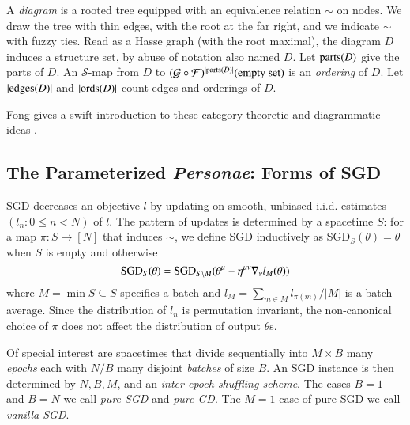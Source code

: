 \documentclass{article}
\newcommand{\Free}{\mathcal{F}}
\newcommand{\Forg}{\mathcal{G}}
\newcommand{\edges}{\text{\textnormal{edges}}}
\newcommand{\ords}{\text{\textnormal{ords}}}
\newcommand{\parts}{\text{\textnormal{parts}}}
\newcommand{\Ss}{\mathcal{S}}
\newcommand{\SGD}{\text{\textnormal{SGD}}}
\newcommand{\wabs}[1]{\left|#1\right|}
\begin{document}
        A \emph{diagram} is a rooted tree equipped with an equivalence relation
        $\sim$ on nodes.  We draw the tree with thin edges, with the root at
        the far right, and we indicate $\sim$ with fuzzy ties.  Read as a Hasse
        graph (with the root maximal), the diagram $D$ induces a structure set,
        by abuse of notation also named $D$.  Let $\parts(D)$ give the parts of
        $D$.  An $\Ss$-map from $D$ to
        $(\Forg\circ\Free)^{|\parts(D)|}(\text{empty set})$ is an \emph{ordering} of $D$.
        Let $|\edges(D)|$ and
        $|\ords(D)|$ count edges and orderings of $D$.
    
        Fong gives a swift introduction to these category theoretic and
        diagrammatic ideas .
            

    \subsection{The Parameterized \emph{Personae}: Forms of SGD}
        SGD decreases an objective $l$ by updating on smooth, unbiased i.i.d.
        estimates $(l_n: 0\leq n<N)$ of $l$.  The pattern of updates is
        determined by a spacetime $S$: for a map
        $\pi:S\to [N]$ that induces $\sim$, we define SGD inductively as
        $\text{SGD}_{S}(\theta) = \theta$ when $S$ is empty and otherwise
        $$
            \SGD_S(\theta) =
                \SGD_{S\setminus M}(\theta^\mu - \eta^{\mu\nu} \nabla_\nu l_{M}(\theta))
        $$
        where $M = \min S \subseteq S$ specifies a batch and $l_M = \sum_{m\in
        M} l_{\pi(m)} / \wabs{M}$ is a batch average.  Since the distribution
        of $l_n$ is permutation invariant, the non-canonical choice of $\pi$
        does not affect the distribution of output $\theta$s.
    
        Of special interest are spacetimes that divide sequentially into
        $M\times B$ many \emph{epochs} each with $N/B$ many disjoint
        \emph{batches} of size $B$.  An SGD instance is then determined by $N,
        B, M$, and an \emph{inter-epoch shuffling scheme}.  The cases $B=1$ and
        $B=N$ we call \emph{pure SGD} and \emph{pure GD}.  The $M=1$ case of
        pure SGD we call \emph{vanilla SGD}.

\end{document}
